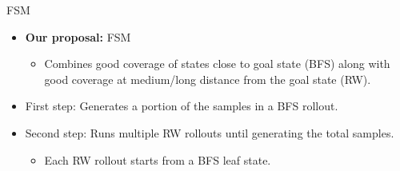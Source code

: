 \documentclass{gkibeamer}
\begin{document}
\begin{frame}{FSM}
\begin{itemize}
    \item \textbf{Our proposal:} FSM
    \begin{itemize}
        \item Combines good coverage of states close to goal state (BFS) along with good coverage at medium/long distance from the goal state (RW).
    \end{itemize}
    \bigskip \pause
    \item First step: Generates a portion of the samples in a BFS rollout.
    \pause
    \item Second step: Runs multiple RW rollouts until generating the total samples.
    \begin{itemize}
        \item Each RW rollout starts from a BFS leaf state.
    \end{itemize}
\end{itemize}
\end{frame}
\end{document}
